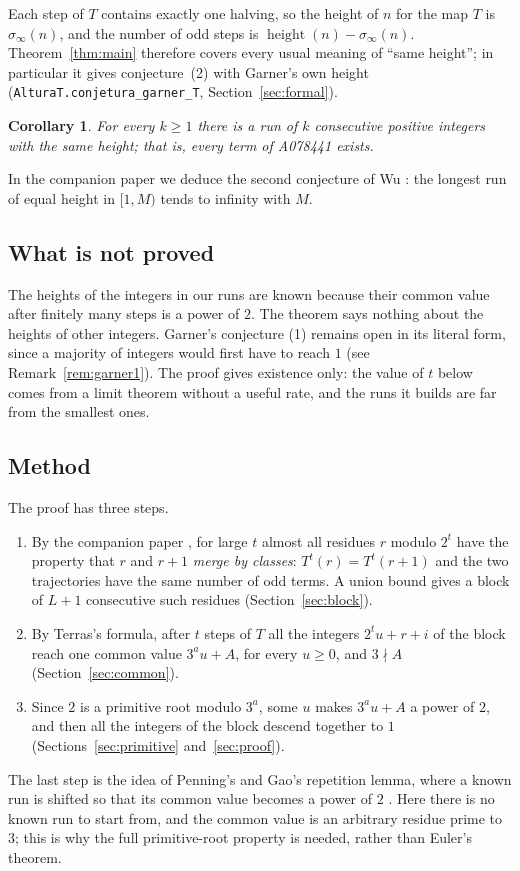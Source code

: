 \documentclass[11pt]{amsart}
\newtheorem{corollary}[theorem]{Corollary}
\theoremstyle{definition}
\theoremstyle{remark}
\newcommand{\lean}[1]{\nolinkurl{#1}}
\begin{document}
Each step of $T$ contains exactly one halving, so the height of $n$ for the map $T$ is $\sigma_\infty(n)$, and the number of odd steps is $\operatorname{height}(n)-\sigma_\infty(n)$. Theorem~\ref{thm:main} therefore covers every usual meaning of ``same height''; in particular it gives conjecture~(2) with Garner's own height (\lean{AlturaT.conjetura_garner_T}, Section~\ref{sec:formal}).

\begin{corollary}\label{cor:A078441}
For every $k\ge1$ there is a run of $k$ consecutive positive integers with the same height; that is, every term of A078441 exists.
\end{corollary}

In the companion paper \cite{SaidWu} we deduce the second conjecture of Wu \cite{Wu92}: the longest run of equal height in $[1,M)$ tends to infinity with $M$.

\subsection*{What is not proved}
The heights of the integers in our runs are known because their common value after finitely many steps is a power of $2$. The theorem says nothing about the heights of other integers. Garner's conjecture (1) remains open in its literal form, since a majority of integers would first have to reach $1$ (see Remark~\ref{rem:garner1}). The proof gives existence only: the value of $t$ below comes from a limit theorem without a useful rate, and the runs it builds are far from the smallest ones.

\subsection*{Method}
The proof has three steps.
\begin{enumerate}
\item By the companion paper \cite{SaidGao}, for large $t$ almost all residues $r$ modulo $2^t$ have the property that $r$ and $r+1$ \emph{merge by classes}: $T^{t}(r)=T^{t}(r+1)$ and the two trajectories have the same number of odd terms. A union bound gives a block of $L+1$ consecutive such residues (Section~\ref{sec:block}).
\item By Terras's formula, after $t$ steps of $T$ all the integers $2^tu+r+i$ of the block reach one common value $3^au+A$, for every $u\ge0$, and $3\nmid A$ (Section~\ref{sec:common}).
\item Since $2$ is a primitive root modulo $3^a$, some $u$ makes $3^au+A$ a power of $2$, and then all the integers of the block descend together to $1$ (Sections~\ref{sec:primitive} and~\ref{sec:proof}).
\end{enumerate}
The last step is the idea of Penning's and Gao's repetition lemma, where a known run is shifted so that its common value becomes a power of $2$ \cite[Lemma~1]{Gao93}. Here there is no known run to start from, and the common value is an arbitrary residue prime to $3$; this is why the full primitive-root property is needed, rather than Euler's theorem.
\end{document}
